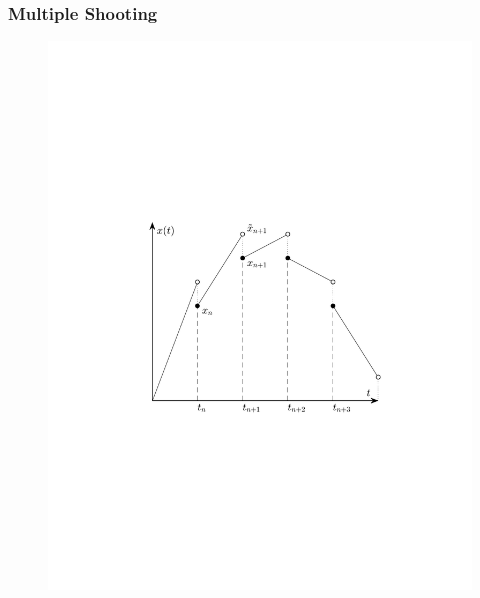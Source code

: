 \begin{frame}
	\frametitle{Multiple Shooting}
	
	\begin{figure}[bth]
	  \begin{center}
	    \includegraphics[trim=1cm 5cm 0cm 8cm, clip=true, 
	    width=\linewidth]{img/multShootPlot}
	  \end{center}
	\end{figure}
\end{frame}


